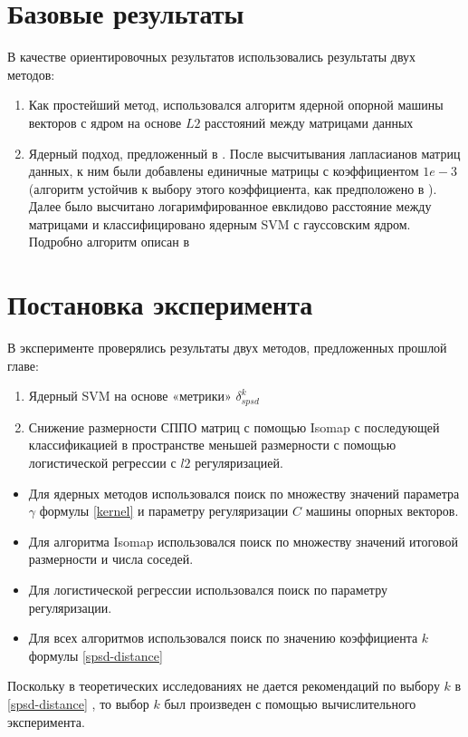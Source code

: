 \section{Базовые результаты}
\indent В качестве ориентировочных результатов использовались результаты двух методов:
\begin{enumerate}
    \item Как простейший метод, использовался алгоритм ядерной опорной машины векторов с ядром на основе $L2$ расстояний между матрицами данных
    \item Ядерный подход, предложенный в \cite{dodero2015kernel}. После высчитывания лапласианов матриц данных, к ним были добавлены единичные матрицы с коэффициентом $1e-3$ (алгоритм устойчив к выбору этого коэффициента, как предположено в \cite{dodero2015kernel}). Далее было высчитано логаримфированное евклидово расстояние между матрицами и классифицировано ядерным SVM с гауссовским ядром. Подробно алгоритм описан в \cite{dodero2015kernel}
\end{enumerate}

\section{Постановка эксперимента}
\indent В эксперименте проверялись результаты двух методов, предложенных прошлой главе:
\begin{enumerate}
    \item Ядерный SVM на основе «метрики» $\delta^k_{spsd}$
    \item Снижение размерности СППО матриц с помощью Isomap с последующей классификацией в пространстве меньшей размерности с помощью логистической регрессии с $l2$ регуляризацией.
\end{enumerate}

\begin{itemize}
    \item Для ядерных методов использовался поиск по множеству значений параметра $\gamma$ формулы \eqref{kernel} и параметру регуляризации $C$ машины опорных векторов.
    \item Для алгоритма Isomap использовался поиск по множеству значений итоговой размерности и числа соседей.
    \item Для логистической регрессии использовался поиск по параметру регуляризации.
    \item Для всех алгоритмов использовался поиск по значению коэффициента $k$ формулы \eqref{spsd-distance}
\end{itemize}
Поскольку в теоретических исследованиях не дается рекомендаций по выбору $k$ в \eqref{spsd-distance} \cite{bonnabel2009riemannian}, то выбор $k$ был произведен с помощью вычислительного эксперимента.
 
